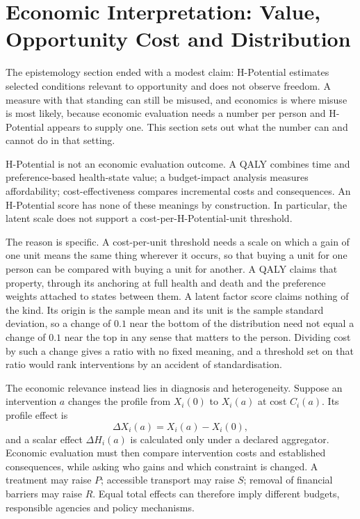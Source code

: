 \section{Economic Interpretation: Value, Opportunity Cost and Distribution}
\label{sec:lit-economics}

The epistemology section ended with a modest claim: H-Potential estimates selected conditions relevant to opportunity and does not observe freedom. A measure with that standing can still be misused, and economics is where misuse is most likely, because economic evaluation needs a number per person and H-Potential appears to supply one. This section sets out what the number can and cannot do in that setting.

H-Potential is not an economic evaluation outcome. A QALY combines time and
preference-based health-state value; a budget-impact analysis measures
affordability; cost-effectiveness compares incremental costs and consequences.
An H-Potential score has none of these meanings by construction. In particular,
the latent scale does not support a cost-per-H-Potential-unit threshold.

The reason is specific. A cost-per-unit threshold needs a scale on which a
gain of one unit means the same thing wherever it occurs, so that buying a unit
for one person can be compared with buying a unit for another. A QALY claims
that property, through its anchoring at full health and death and the
preference weights attached to states between them. A latent factor score
claims nothing of the kind. Its origin is the sample mean and its unit is the
sample standard deviation, so a change of $0.1$ near the bottom of the
distribution need not equal a change of $0.1$ near the top in any sense that
matters to the person. Dividing cost by such a change gives a ratio with no
fixed meaning, and a threshold set on that ratio would rank interventions by an
accident of standardisation.

The economic relevance instead lies in diagnosis and heterogeneity. Suppose an
intervention $a$ changes the profile from $X_i(0)$ to $X_i(a)$ at cost $C_i(a)$.
Its profile effect is
\[
\Delta X_i(a)=X_i(a)-X_i(0),
\]
and a scalar effect $\Delta H_i(a)$ is calculated only under a declared
aggregator. Economic evaluation must then compare intervention costs and
established consequences, while asking who gains and which constraint is
changed. A treatment may raise $P$; accessible transport may raise $S$; removal
of financial barriers may raise $R$. Equal total effects can therefore imply
different budgets, responsible agencies and policy mechanisms.

